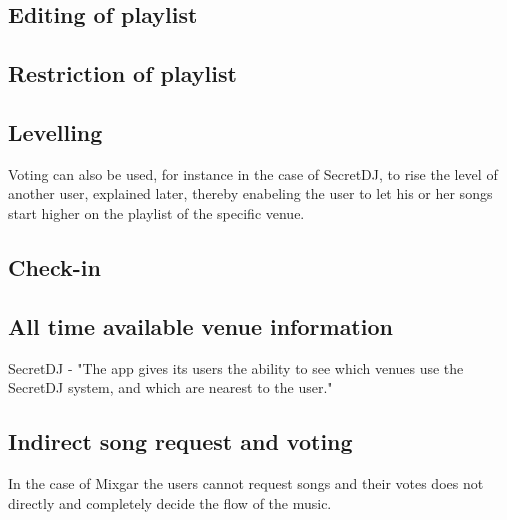 \subsection{Editing of playlist}


\subsection{Restriction of playlist}


\subsection{Levelling}
Voting can also be used, for instance in the case of SecretDJ, to rise the level of another user, explained later, thereby enabeling the user to let his or her songs start higher on the playlist of the specific venue.

\subsection{Check-in}


\subsection{All time available venue information}
SecretDJ -  "The app gives its users the ability to see which venues use the SecretDJ system, and which are nearest to the user."


\subsection{Indirect song request and voting}
In the case of Mixgar the users cannot request songs and their votes does not directly and completely decide the flow of the music. 